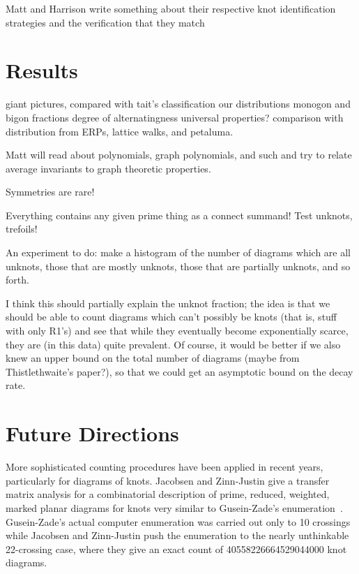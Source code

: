 \documentclass[amsmath,secnumarabic,floatfix,amssymb,nofootinbib,nobibnotes,letterpaper,11pt,tightenlines,showkeys]{revtex4}
\theoremstyle{definition}
\begin{document}
\begin{center}
Matt and Harrison write something about their respective knot identification strategies and the verification that they match
\end{center}

\section{Results}

giant pictures, compared with tait's classification
our distributions
monogon and bigon fractions
degree of alternatingness
universal properties? comparison with distribution from ERPs, lattice walks, and petaluma.

Matt will read about polynomials, graph polynomials, and such and try to relate average invariants to graph theoretic properties.

Symmetries are rare!

Everything contains any given prime thing as a connect summand! Test unknots, trefoils!

An experiment to do: make a histogram of the number of diagrams which are all unknots, those that are mostly unknots, those that are partially unknots, and so forth.

I think this should partially explain the unknot fraction; the idea is that we should be able to count diagrams which can't possibly be knots (that is, stuff with only R1's) and see that while they eventually become exponentially scarce, they are (in this data) quite prevalent. Of course, it would be better if we also knew an upper bound on the total number of diagrams (maybe from Thistlethwaite's paper?), so that we could get an asymptotic bound on the decay rate.


\section{Future Directions}

More sophisticated counting procedures have been applied in recent years, particularly for diagrams of knots. Jacobsen and Zinn-Justin\cite{Jacobsen:2002kia} give a transfer matrix analysis for a combinatorial description of prime, reduced, weighted, marked planar diagrams for knots very similar to Gusein-Zade's enumeration~\cite{GusenZade:1994wl,GusenZade:1998jz}. Gusein-Zade's actual computer enumeration was carried out only to 10 crossings while Jacobsen and Zinn-Justin push the enumeration to the nearly unthinkable 22-crossing case, where they give an exact count of 40558226664529044000 knot diagrams. 
\end{document}
